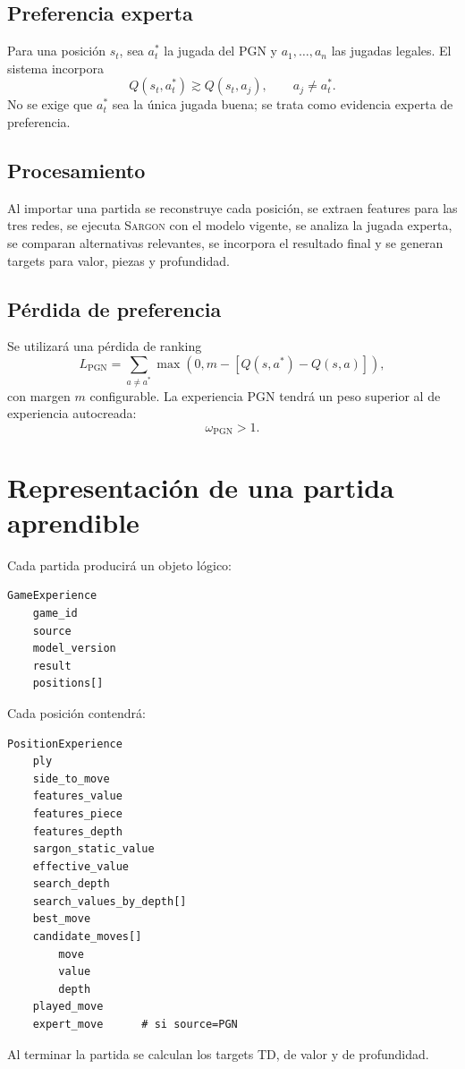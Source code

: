 \documentclass[11pt,a4paper]{article}
\newcommand{\Sargon}{\textsc{Sargon}}
\begin{document}
\subsection{Preferencia experta}
Para una posición $s_t$, sea $a_t^*$ la jugada del PGN y $a_1,\ldots,a_n$ las jugadas legales. El sistema incorpora
\[
Q(s_t,a_t^*)\gtrsim Q(s_t,a_j),\qquad a_j\ne a_t^*.
\]
No se exige que $a_t^*$ sea la única jugada buena; se trata como evidencia experta de preferencia.

\subsection{Procesamiento}
Al importar una partida se reconstruye cada posición, se extraen features para las tres redes, se ejecuta \Sargon{} con el modelo vigente, se analiza la jugada experta, se comparan alternativas relevantes, se incorpora el resultado final y se generan targets para valor, piezas y profundidad.

\subsection{Pérdida de preferencia}
Se utilizará una pérdida de ranking
\[
L_{\mathrm{PGN}}=\sum_{a\ne a^*}\max\left(0,m-[Q(s,a^*)-Q(s,a)]\right),
\]
con margen $m$ configurable. La experiencia PGN tendrá un peso superior al de experiencia autocreada:
\[
\omega_{\mathrm{PGN}}>1.
\]

\section{Representación de una partida aprendible}
Cada partida producirá un objeto lógico:
\begin{lstlisting}
GameExperience
    game_id
    source
    model_version
    result
    positions[]
\end{lstlisting}
Cada posición contendrá:
\begin{lstlisting}
PositionExperience
    ply
    side_to_move
    features_value
    features_piece
    features_depth
    sargon_static_value
    effective_value
    search_depth
    search_values_by_depth[]
    best_move
    candidate_moves[]
        move
        value
        depth
    played_move
    expert_move      # si source=PGN
\end{lstlisting}
Al terminar la partida se calculan los targets TD, de valor y de profundidad.
\end{document}
